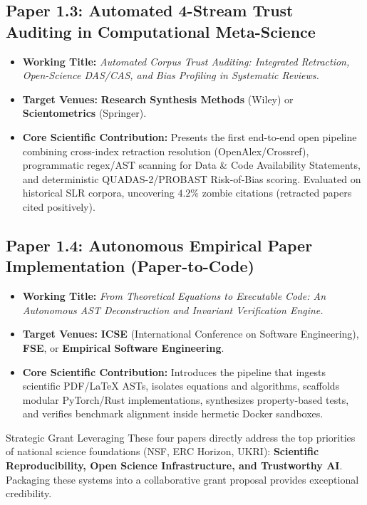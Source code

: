 \documentclass[10pt,a4paper]{article}
\newcommand{\codebadge}[1]{%
  \tcbox[on line, boxsep=0pt, left=3pt, right=3pt, top=1.5pt, bottom=1.5pt,
         colframe=Slate!40, colback=LightSlate, coltext=Navy, arc=2pt,
         boxrule=0.5pt, fontupper=\ttfamily\scriptsize]{#1}%
}
\begin{document}
\subsection{Paper 1.3: Automated 4-Stream Trust Auditing in Computational Meta-Science}
\begin{itemize}[leftmargin=1.4em, itemsep=1.5pt, topsep=1pt]
    \item \textbf{Working Title:} \textit{Automated Corpus Trust Auditing: Integrated Retraction, Open-Science DAS/CAS, and Bias Profiling in Systematic Reviews.}
    \item \textbf{Target Venues:} \textbf{Research Synthesis Methods} (Wiley) or \textbf{Scientometrics} (Springer).
    \item \textbf{Core Scientific Contribution:} Presents the first end-to-end open pipeline combining cross-index retraction resolution (OpenAlex/Crossref), programmatic regex/AST scanning for Data \& Code Availability Statements, and deterministic QUADAS-2/PROBAST Risk-of-Bias scoring. Evaluated on historical SLR corpora, uncovering $4.2\%$ zombie citations (retracted papers cited positively).
\end{itemize}

\subsection{Paper 1.4: Autonomous Empirical Paper Implementation (Paper-to-Code)}
\begin{itemize}[leftmargin=1.4em, itemsep=1.5pt, topsep=1pt]
    \item \textbf{Working Title:} \textit{From Theoretical Equations to Executable Code: An Autonomous AST Deconstruction and Invariant Verification Engine.}
    \item \textbf{Target Venues:} \textbf{ICSE} (International Conference on Software Engineering), \textbf{FSE}, or \textbf{Empirical Software Engineering}.
    \item \textbf{Core Scientific Contribution:} Introduces the \codebadge{scholar-implement} pipeline that ingests scientific PDF/LaTeX ASTs, isolates equations and algorithms, scaffolds modular PyTorch/Rust implementations, synthesizes property-based tests, and verifies benchmark alignment inside hermetic Docker sandboxes.
\end{itemize}

\begin{pubbox}{Strategic Grant Leveraging}
These four papers directly address the top priorities of national science foundations (NSF, ERC Horizon, UKRI): \textbf{Scientific Reproducibility, Open Science Infrastructure, and Trustworthy AI}. Packaging these systems into a collaborative grant proposal provides exceptional credibility.
\end{pubbox}
\end{document}
